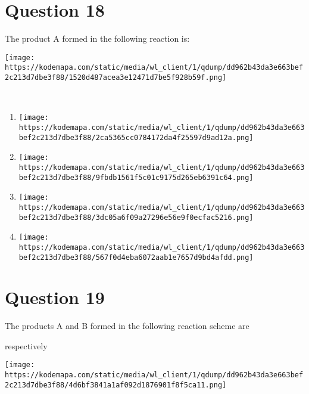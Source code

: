\documentclass{article}
\begin{document}
\section*{Question 18}
The product A formed in the following reaction is:



\texttt{[image: https://kodemapa.com/static/media/wl\_client/1/qdump/dd962b43da3e663bef2c213d7dbe3f88/1520d487acea3e12471d7be5f928b59f.png]}\\



{}\strut \\


\begin{enumerate}[label=(\alph*)]
\item \texttt{[image: https://kodemapa.com/static/media/wl\_client/1/qdump/dd962b43da3e663bef2c213d7dbe3f88/2ca5365cc0784172da4f25597d9ad12a.png]}


\item \texttt{[image: https://kodemapa.com/static/media/wl\_client/1/qdump/dd962b43da3e663bef2c213d7dbe3f88/9fbdb1561f5c01c9175d265eb6391c64.png]}


\item \texttt{[image: https://kodemapa.com/static/media/wl\_client/1/qdump/dd962b43da3e663bef2c213d7dbe3f88/3dc05a6f09a27296e56e9f0ecfac5216.png]}


\item \texttt{[image: https://kodemapa.com/static/media/wl\_client/1/qdump/dd962b43da3e663bef2c213d7dbe3f88/567f0d4eba6072aab1e7657d9bd4afdd.png]}


\end{enumerate}
\newpage
\section*{Question 19}
The products A and B formed in the following reaction scheme are

respectively



\texttt{[image: https://kodemapa.com/static/media/wl\_client/1/qdump/dd962b43da3e663bef2c213d7dbe3f88/4d6bf3841a1af092d1876901f8f5ca11.png]}\\



{}\strut \\
\end{document}

